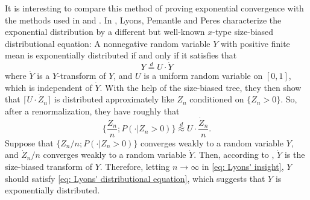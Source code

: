 \documentclass[UTF8]{pkuthss}
\theoremstyle{plain}
\theoremstyle{definition}
\numberwithin{equation}{section}
\begin{document}
It is interesting to compare this method of proving exponential convergence with the methods
used in \cite{Geiger2000New} and \cite{LyonsPemantlePeres1995Conceptual}.
In \cite{LyonsPemantlePeres1995Conceptual}, Lyons, Pemantle and Peres characterize the exponential distribution by a different
but well-known $x$-type size-biased distributional equation:
A nonnegative random variable $Y$ with positive finite mean is exponentially distributed if and only if it satisfies that
\begin{equation}
\label{eq: Lyons' distributional equation}
Y 		\overset{d}= U \cdot \dot Y
\end{equation}
	where $\dot Y$ is a $Y$-transform of $Y$,  and $U$ is a uniform random variable on $[0,1]$, which is independent of $\dot Y$.
	With the help of the size-biased tree,
	they then show that $\lceil U \cdot \dot Z_n \rceil$ is distributed approximately like $Z_n$ conditioned on $\{Z_n > 0\}$.
	So, after a renormalization, they have roughly that
\begin{equation}
\label{eq: Lyons' insight}
\Big\{\frac{Z_n}{n} ; P(  \cdot| Z_n > 0) \Big\}
\overset{d}{\approx} U \cdot \frac{ \dot Z_n}{n}.
\end{equation}
	Suppose that $\{Z_n/n; P(\cdot | Z_n > 0)\}$ converges weakly to a random variable $Y$, and $\dot Z_n /n$ converges weakly to a random variable $\dot Y$.
	Then, according to \cite[Lemma 4.3]{LyonsPemantlePeres1995Conceptual}, $\dot Y$ is the size-biased transform of $Y$.
	Therefore, letting $n\to \infty$ in \eqref{eq: Lyons' insight},
	$Y$ should satisfy \eqref{eq: Lyons' distributional equation}, which suggests that $Y$ is exponentially distributed.
\end{document}
